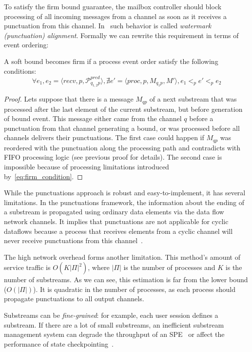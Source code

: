 To satisfy the firm bound guarantee, the mailbox controller should block processing of all incoming messages from a channel as soon as it receives a punctuation from this channel. In~\cite{Carbone:2017:SMA:3137765.3137777} such behavior is called {\em watermark (punctuation) alignment}. Formally we can rewrite this requirement in terms of event ordering:

\begin{lemma}
A soft bound becomes firm if a process event order satisfy the following conditions:
\begin{equation}
  \forall e_1, e_2 = \langle recv, p, \mathcal{P}^{pred}_{q_{1,2}p} \rangle, \nexists e' = \langle proc, p, M_{q_1p}, M' \rangle, e_1 <_p e' <_p e_2
  \label{eq:firm_condition}
\end{equation}
\end{lemma}
\begin{proof}
Lets suppose that there is a message $M_{qp}$ of a next substream that was processed after the last element of the current substream, but before generation of bound event. This message either came from the channel $q$ before a punctuation from that channel generating a bound, or was processed before all channels delivers their punctuations. The first case could happen if $M_{qp}$ was reordered with the punctuation along the processing path and contradicts with FIFO processing logic (see previous proof for details). The second case is impossible because of processing limitations introduced by~\ref{eq:firm_condition}.
\end{proof}

While the punctuations approach is robust and easy-to-implement, it has several limitations. In the punctuations framework, the information about the ending of a substream is propagated using ordinary data elements via the data flow network channels. It implies that punctuations are not applicable for cyclic dataflows because a process that receives elements from a cyclic channel will never receive punctuations from this channel~\cite{carbone2018scalable}.

The high network overhead forms another limitation. This method's amount of service traffic is $O(K|\Pi|^2)$, where $|\Pi|$ is the number of processes and $K$ is the number of substreams. As we can see, this estimation is far from the lower bound ($O(|\Pi|)$). It is quadratic in the number of processes, as each process should propagate punctuations to all output channels. 

Substreams can be {\em fine-grained}: for example, each user session defines a substream. If there are a lot of small substreams, an inefficient substream management system can degrade the throughput of an SPE~\cite{Li:2008:OPN:1453856.1453890} or affect the performance of state checkpointing~\cite{zhang2021research}.